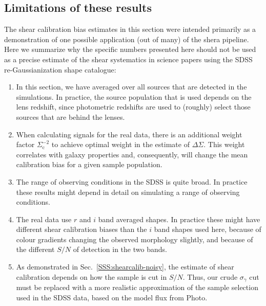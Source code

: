 \documentclass[twocolumn,useAMS,usenatbib]{mn2e}
\begin{document}
\subsection{Limitations of these results}\label{SSS:limitations}

The shear calibration bias estimates in this section were intended 
primarily as a demonstration of one possible application (out of many)
of the {\sc shera}
pipeline.  Here we summarize why the specific numbers presented here should not be used
as a precise estimate of the shear systematics in
science papers using the SDSS re-Gaussianization shape catalogue:
\begin{enumerate}
\item In this section, we have averaged over all sources that are
  detected in the simulations.  In practice, the source population
  that is used depends on the lens redshift, since photometric
  redshifts are used to (roughly) select those sources that are behind
  the lenses.
\item When calculating signals for the real data, there is an
  additional weight factor $\Sigma_\mathrm{c}^{-2}$ to achieve
  optimal weight in the estimate of $\Delta\Sigma$.  This weight
  correlates with galaxy properties and, consequently, will change the
  mean calibration bias for a given sample population.
\item The range of observing conditions in the SDSS is quite broad.
  In practice these results might depend in detail on simulating a
  range of observing conditions.
\item The real data use $r$ and $i$ band averaged shapes.  In practice
  these might have different shear calibration biases than the $i$
  band shapes used here, because of colour gradients changing the
  observed morphology slightly, and because of the different $S/N$ of
  detection in the two bands.
\item As demonstrated in Sec.~\ref{SSS:shearcalib-noisy}, the
  estimate of shear calibration depends on how the sample is cut in
  $S/N$.  Thus, our crude $\sigma_\gamma$ cut must be replaced with a
  more realistic approximation of the sample selection used in the
  SDSS data, based on the model flux from {\sc Photo}.

\end{enumerate}
\end{document}
